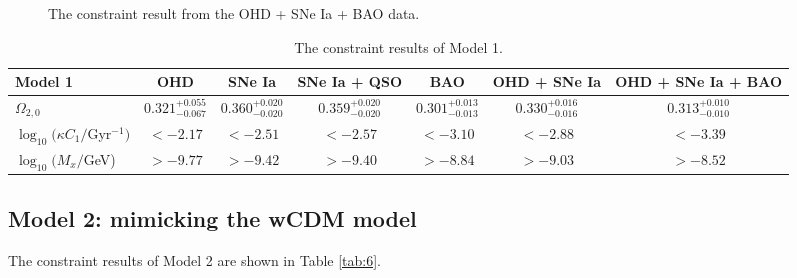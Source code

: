 \documentclass[twocolumn]{aastex631}
\begin{document}
   \begin{figure}[htbp]
      \centering
      \caption{The constraint result from the OHD + SNe Ia + BAO data.}
      \label{fig:6}
   \end{figure}

   \begin{table}[htbp]
      \centering
      \begin{tabular}{lcccccc}
         \hline\hline
         Model 1 & OHD & SNe Ia & SNe Ia + QSO & BAO &
          OHD + SNe Ia & OHD + SNe Ia + BAO \\
         \hline
         $\Omega_{2,0}$ & $0.321_{-0.067}^{+0.055}$ & $0.360_{-0.020}^{+0.020}$
          & $0.359_{-0.020}^{+0.020}$ & $0.301_{-0.013}^{+0.013}$
          & $0.330_{-0.016}^{+0.016}$ & $0.313_{-0.010}^{+0.010}$ \\
         $\log_{10}(\kappa C_1/$Gyr${}^{-1})$ & $<-2.17$ & $<-2.51$ & $<-2.57$
          & $<-3.10$ & $<-2.88$ & $<-3.39$ \\
         $\log_{10}(M_x/$GeV) & $>-9.77$ & $>-9.42$ & $>-9.40$
          & $>-8.84$ & $>-9.03$ & $>-8.52$ \\
         \hline
      \end{tabular}
      \caption{The constraint results of Model 1.}
      \label{tab:5}
   \end{table}

\subsection{Model 2: mimicking the wCDM model}

   The constraint results of Model 2 are shown in Table \ref{tab:6}.
\end{document}
